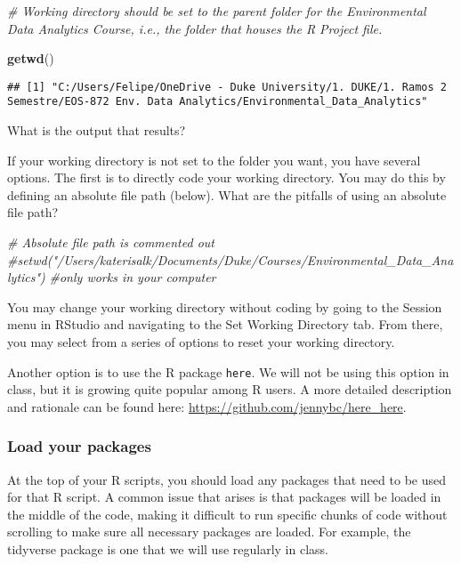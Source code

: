 \documentclass[]{article}
\newenvironment{Shaded}{\begin{snugshade}}{\end{snugshade}}
\newcommand{\KeywordTok}[1]{\textcolor[rgb]{0.13,0.29,0.53}{\textbf{#1}}}
\newcommand{\CommentTok}[1]{\textcolor[rgb]{0.56,0.35,0.01}{\textit{#1}}}
\newcommand{\NormalTok}[1]{#1}
\begin{document}
\begin{Shaded}
\begin{Highlighting}[]
\CommentTok{# Working directory should be set to the parent folder for the Environmental Data Analytics Course, i.e., the folder that houses the R Project file.}

\KeywordTok{getwd}\NormalTok{()}
\end{Highlighting}
\end{Shaded}

\begin{verbatim}
## [1] "C:/Users/Felipe/OneDrive - Duke University/1. DUKE/1. Ramos 2 Semestre/EOS-872 Env. Data Analytics/Environmental_Data_Analytics"
\end{verbatim}

What is the output that results?

If your working directory is not set to the folder you want, you have
several options. The first is to directly code your working directory.
You may do this by defining an absolute file path (below). What are the
pitfalls of using an absolute file path?

\begin{Shaded}
\begin{Highlighting}[]
\CommentTok{# Absolute file path is commented out}
\CommentTok{#setwd("/Users/katerisalk/Documents/Duke/Courses/Environmental_Data_Analytics")}
\CommentTok{#only works in your computer}
\end{Highlighting}
\end{Shaded}

You may change your working directory without coding by going to the
Session menu in RStudio and navigating to the Set Working Directory tab.
From there, you may select from a series of options to reset your
working directory.

Another option is to use the R package \texttt{here}. We will not be
using this option in class, but it is growing quite popular among R
users. A more detailed description and rationale can be found here:
\url{https://github.com/jennybc/here_here}.

\subsubsection{Load your packages}\label{load-your-packages}

At the top of your R scripts, you should load any packages that need to
be used for that R script. A common issue that arises is that packages
will be loaded in the middle of the code, making it difficult to run
specific chunks of code without scrolling to make sure all necessary
packages are loaded. For example, the tidyverse package is one that we
will use regularly in class.
\end{document}
